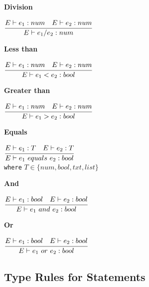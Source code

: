 \textbf{Division}\\
\begin{center}
	\begin{math}
	\cfrac
	{E \vdash e_1: num \quad E \vdash e_2: num}
	{E \vdash e_1 / e_2 : num}
	\end{math}
\end{center}

\textbf{Less than}\\
\begin{center}
	\begin{math}
	\cfrac
	{E \vdash e_1: num \quad E \vdash e_2: num}
	{E \vdash e_1 < e_2 : bool}
	\end{math}
\end{center}

\textbf{Greater than}\\
\begin{center}
	\begin{math}
	\cfrac
	{E \vdash e_1: num \quad E \vdash e_2: num}
	{E \vdash e_1 > e_2 : bool}
	\end{math}
\end{center}

\textbf{Equals}\\
\begin{center}
	\begin{math}
	\cfrac
	{E \vdash e_1: T \quad E \vdash e_2: T}
	{E \vdash e_1\ equals\ e_2 : bool}
	\end{math}\\[1\baselineskip]
	\texttt{where} $T \in \{num, bool, txt, list\}$
\end{center}

\textbf{And}\\
\begin{center}
	\begin{math}
	\cfrac
	{E \vdash e_1: bool \quad E \vdash e_2: bool}
	{E \vdash e_1\ and\ e_2 : bool}
	\end{math}
\end{center}

\textbf{Or}\\
\begin{center}
	\begin{math}
	\cfrac
	{E \vdash e_1: bool \quad E \vdash e_2: bool}
	{E \vdash e_1\ or\ e_2 : bool}
	\end{math}
\end{center}


\subsection{Type Rules for Statements}


